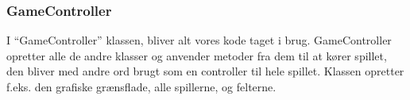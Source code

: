 \subsubsection{GameController}
I “GameController” klassen, bliver alt vores kode taget i brug. GameController opretter alle de andre klasser og anvender metoder fra dem til at kører spillet, den bliver med andre ord brugt som en controller til hele spillet. Klassen opretter f.eks. den grafiske grænsflade, alle spillerne, og felterne. 


